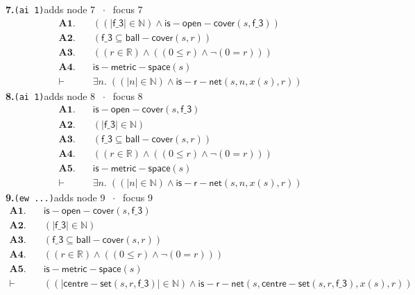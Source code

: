 \documentclass[11pt]{article}
\begin{document}
\medskip\noindent\textbf{7.}\quad \texttt{(ai 1)}\hfill{\small adds node 7 $\;\cdot\;$ focus 7}\\[2pt]
\begin{align*}
  \mathbf{A1.}\quad & ((|\mathsf{f\_3}| \in \mathbb{N}) \wedge \mathsf{is{-}open{-}cover}(s, \mathsf{f\_3})) \\
  \mathbf{A2.}\quad & (\mathsf{f\_3} \subseteq \mathsf{ball{-}cover}(s, r)) \\
  \mathbf{A3.}\quad & ((r \in \mathbb{R}) \wedge ((0 \leq r) \wedge \neg (0 = r))) \\
  \mathbf{A4.}\quad & \mathsf{is{-}metric{-}space}(s) \\
  \vdash\quad & \exists n.\; ((|n| \in \mathbb{N}) \wedge \mathsf{is{-}r{-}net}(s, n, x(s), r))
\end{align*}
\medskip\noindent\textbf{8.}\quad \texttt{(ai 1)}\hfill{\small adds node 8 $\;\cdot\;$ focus 8}\\[2pt]
\begin{align*}
  \mathbf{A1.}\quad & \mathsf{is{-}open{-}cover}(s, \mathsf{f\_3}) \\
  \mathbf{A2.}\quad & (|\mathsf{f\_3}| \in \mathbb{N}) \\
  \mathbf{A3.}\quad & (\mathsf{f\_3} \subseteq \mathsf{ball{-}cover}(s, r)) \\
  \mathbf{A4.}\quad & ((r \in \mathbb{R}) \wedge ((0 \leq r) \wedge \neg (0 = r))) \\
  \mathbf{A5.}\quad & \mathsf{is{-}metric{-}space}(s) \\
  \vdash\quad & \exists n.\; ((|n| \in \mathbb{N}) \wedge \mathsf{is{-}r{-}net}(s, n, x(s), r))
\end{align*}
\medskip\noindent\textbf{9.}\quad \texttt{(ew ...)}\hfill{\small adds node 9 $\;\cdot\;$ focus 9}\\[2pt]
\begin{align*}
  \mathbf{A1.}\quad & \mathsf{is{-}open{-}cover}(s, \mathsf{f\_3}) \\
  \mathbf{A2.}\quad & (|\mathsf{f\_3}| \in \mathbb{N}) \\
  \mathbf{A3.}\quad & (\mathsf{f\_3} \subseteq \mathsf{ball{-}cover}(s, r)) \\
  \mathbf{A4.}\quad & ((r \in \mathbb{R}) \wedge ((0 \leq r) \wedge \neg (0 = r))) \\
  \mathbf{A5.}\quad & \mathsf{is{-}metric{-}space}(s) \\
  \vdash\quad & ((|\mathsf{centre{-}set}(s, r, \mathsf{f\_3})| \in \mathbb{N}) \wedge \mathsf{is{-}r{-}net}(s, \mathsf{centre{-}set}(s, r, \mathsf{f\_3}), x(s), r))
\end{align*}
\end{document}
